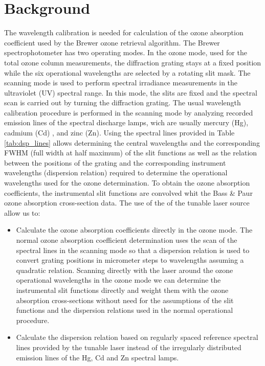 \documentclass[acp, manuscript]{copernicus}
\begin{document}

\section{Background}

The wavelength calibration is needed for calculation of the ozone absorption coefficient used by the Brewer ozone retrieval algorithm. The Brewer spectrophotometer has two operating  modes. In the ozone mode, used for the total ozone column measurements, the diffraction grating stays at a fixed position while the six operational wavelengths are selected by a rotating slit mask.  The scanning mode is used to perform spectral irradiance measurements in the ultraviolet (UV) spectral range. In this mode, the slits are fixed and the spectral scan is carried out by turning the diffraction grating. The usual wavelength calibration procedure is performed in the scanning mode by analyzing recorded emission lines of the spectral discharge lamps, wich are usually mercury (Hg), cadmium (Cd) , and zinc (Zn). Using the spectral lines provided in Table \ref{tab:dsp_lines} allows determining the central wavelengths and the corresponding FWHM (full width at half maximum) of the slit functions as well as the relation between the positions of the grating  and the corresponding instrument wavelengths (dispersion relation) required to determine the operational wavelengths used for the ozone determination. To obtain the ozone absorption coefficients, the instrumental slit functions are convolved whit the Bass \& Paur ozone absorption cross-section data.
The use of the of the tunable laser  source allow us to:
\begin{itemize}

    \item Calculate the ozone absorption coefficients directly in the ozone mode. The normal ozone absorption coefficient determination uses the scan of the spectral lines in the scanning mode so that a dispersion relation is used to convert grating positions in micrometer steps to wavelengths assuming a quadratic relation. Scanning directly with the laser around the ozone operational wavelengths in the ozone mode we can determine the instrumental slit functions directly and weight them with the ozone absorption cross-sections without need for the assumptions of the slit functions and the dispersion relations used in the normal operational procedure.
    \item Calculate the dispersion relation based on regularly spaced reference spectral lines provided by the tunable laser instead of the irregularly distributed  emission lines of the  Hg, Cd and Zn spectral lamps. 
\end{itemize}
\end{document}

